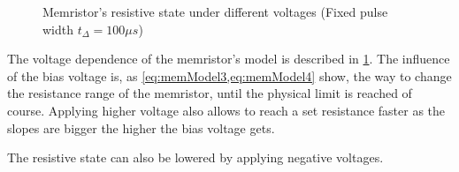 \begin{figure}[H]
  \centering
  
  \caption{Memristor's resistive state under different voltages (Fixed pulse width $t_{\Delta}=100\mu s$)}
  \label{graph:voltChange}
\end{figure}

The voltage dependence of the memristor's model is described in \cref{graph:voltChange}. The influence of the bias voltage is, as \cref{eq:memModel3,eq:memModel4} show, the way to change the resistance range of the memristor, until the physical limit is reached of course. Applying higher voltage also allows to reach a set resistance faster as the slopes are bigger the higher the bias voltage gets.

The resistive state can also be lowered by applying negative voltages.%



